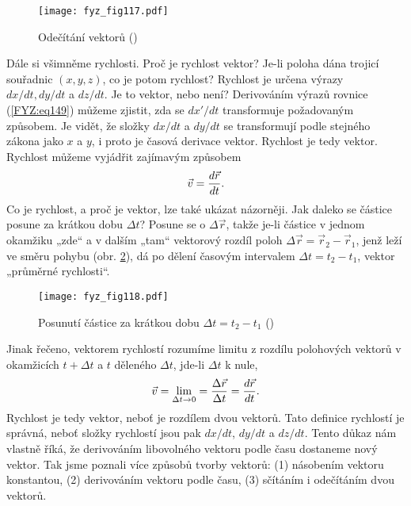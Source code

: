 {    \begin{figure}[ht!]  %
      \centering
      \texttt{[image: fyz\_fig117.pdf]}
      \caption{Odečítání vektorů
              (\cite[s.~161]{Feynman01})}
      \label{fyz:fig117}
    \end{figure}
    Dále si všimněme rychlosti. Proč je rychlost vektor? Je-li poloha dána trojicí souřadnic 
    \((x,y, z)\), co je potom rychlost? Rychlost je určena výrazy \(dx/dt, dy/dt\) a \(dz/dt\). Je 
    to vektor, nebo není? Derivováním výrazů rovnice (\ref{FYZ:eq149}) můžeme zjistit, zda se 
    \(dx'/dt\) transformuje požadovaným způsobem. Je vidět, že složky \(dx/dt\) a \(dy/dt\) se 
    transformují podle stejného zákona jako \(x\) a \(y\), i proto je časová derivace vektor. 
    Rychlost je tedy vektor. Rychlost můžeme vyjádřit zajímavým způsobem
    \begin{equation*}
      \vec{v} = \frac{d \vec{r}}{d t}.
    \end{equation*}    
    Co je rychlost, a proč je vektor, lze také ukázat názorněji. Jak daleko se částice posune za 
    krátkou dobu \(\Delta t\)? Posune se o \(\Delta\vec{r}\), takže je-li částice v jednom okamžiku 
    „zde“ a v dalším „tam“ vektorový rozdíl poloh \(\Delta\vec{r} = \vec{r}_2 - \vec{r}_1\), jenž 
    leží ve směru pohybu (obr. \ref{fyz:fig118}), dá po dělení časovým intervalem \(\Delta t = t_2 
    - t_1\), vektor „průměrné rychlosti“.

    \begin{figure}[ht!]  %
      \centering
      \texttt{[image: fyz\_fig118.pdf]}
      \caption{Posunutí částice za krátkou dobu \(\Delta t = t_2 - t_1\)
              (\cite[s.~162]{Feynman01})}
      \label{fyz:fig118}
    \end{figure}
    Jinak řečeno, vektorem rychlostí rozumíme limitu z rozdílu polohových vektorů v okamžicích \(t 
    + \Delta t\) a \(t\) děleného \(\Delta t\), jde-li \(\Delta t\) k nule,
    \begin{equation}\label{FYZ:eq154}
      \vec{v} = \lim\limits_{\Delta t\to0} = \frac{\Delta\vec{r}}{\Delta t}
              = \frac{d \vec{r}}{d t}.
    \end{equation}
    Rychlost je tedy vektor, neboť je rozdílem dvou vektorů. Tato definice rychlostí je správná, 
    neboť složky rychlostí jsou pak \(dx/dt\), \(dy/dt\) a \(dz/dt\). Tento důkaz nám vlastně říká, 
    že derivováním libovolného vektoru podle času dostaneme nový vektor. Tak jsme poznali více 
    způsobů tvorby vektorů: (1) násobením vektoru konstantou, (2) derivováním vektoru podle času, 
    (3) sčítáním i odečítáním dvou vektorů. 

}
